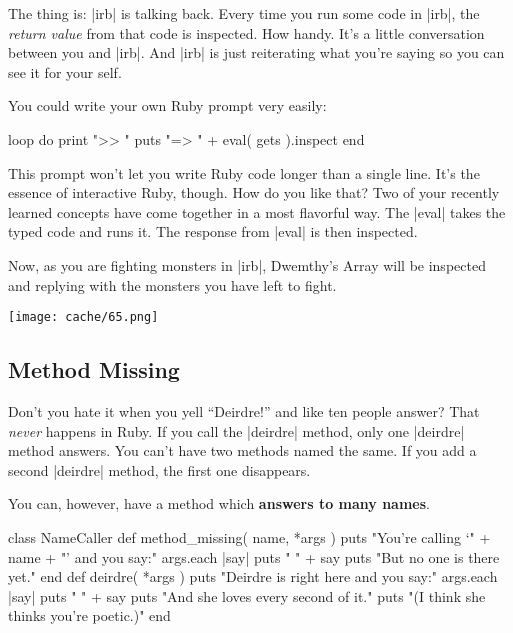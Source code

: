 \documentclass[12pt,twoside]{report}
\begin{document}
The thing is: \rubyinline|irb| is talking back.  Every
time you run some code in \rubyinline|irb|, the {\em
  return value} from that code is inspected.  How handy.  It's a
little conversation between you and \rubyinline|irb|.
And \rubyinline|irb| is just reiterating what you're
saying so you can see it for your self.

You could write your own Ruby prompt very easily:


\begin{rubycode}

 loop do
   print ">> "
   puts  "=> " + eval( gets ).inspect
 end

\end{rubycode}


This prompt won't let you write Ruby code longer than a single line.
It's the essence of interactive Ruby, though.  How do you like that?
Two of your recently learned concepts have come together in a most
flavorful way.  The \rubyinline|eval| takes the typed
code and runs it. The response from \rubyinline|eval|
is then inspected.

Now, as you are fighting monsters in \rubyinline|irb|,
Dwemthy's Array will be inspected and replying with the monsters you
have left to fight.

	\texttt{[image: cache/65.png]}



\subsection{Method Missing}



Don't you hate it when you yell ``Deirdre!'' and like ten people
answer?  That {\em never} happens in Ruby.  If you call the
\rubyinline|deirdre| method, only one
\rubyinline|deirdre| method answers.  You can't have
two methods named the same.  If you add a second
\rubyinline|deirdre| method, the first one disappears.

You can, however, have a method which {\bf answers to many names}.


\begin{rubycode}

 class NameCaller
   def method_missing( name, *args )
     puts "You're calling `" + name + "' and you say:"
     args.each { |say| puts "  " + say }
     puts "But no one is there yet."
   end
   def deirdre( *args )
     puts "Deirdre is right here and you say:"
     args.each { |say| puts "  " + say }
     puts "And she loves every second of it."
     puts "(I think she thinks you're poetic.)"
 end

\end{rubycode}
\end{document}
